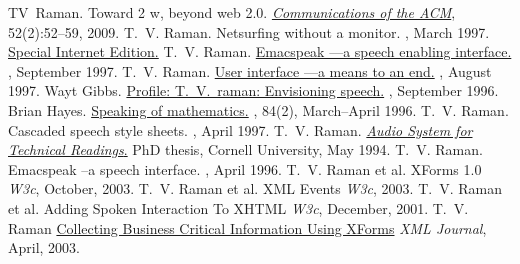 \documentclass{article}
\begin{document}
\begin{plainbibliography}{}
TV~Raman.
\newblock Toward 2 w, beyond web 2.0.
\newblock \href{http://emacspeak.sourceforge.net/raman/publications/beyond-web20-cacm-2009/}{\em Communications of the ACM}, 52(2):52--59, 2009.
 T.~V. Raman.  
\newblock Netsurfing without a monitor.  
, March 1997.
\newblock \href{http://www.sciam.com/0397issue/0397raman.html}%
{Special Internet Edition.}
 T.~V.  Raman.
\newblock \href{http://www.ddj.com/ddj/1997/1997.09/rama.htm}%
{Emacspeak ---a speech enabling interface.}  
, September 1997.
 T.~V.  Raman.  
\newblock
\href{http://www.ddj.com/editorial/1997/raman.htm}%
{User interface ---a means to an end.}  
, August 1997.
 Wayt Gibbs.  
\newblock
\href{http://www.sciam.com/0996issue/0996profile.html}%
{Profile: T.\ V.\ raman: Envisioning speech.}  
, September 1996.
 Brian Hayes.
\newblock  \href{http://www.amsci.org/amsci/issues/Comsci96/compsci96-03.html}%
{Speaking of mathematics.}  
\newblock {\em American Scientist},
84(2), March--April 1996.
 T.~V. Raman.  
\newblock Cascaded speech
  style sheets.  
, April
  1997.
 T.~V.  Raman.  
\newblock
\href{http://www.cs.cornell.edu/home/raman/aster/aster-toplevel.html}%
{{\em Audio System for Technical Readings}.}  
\newblock PhD
thesis, Cornell University, May 1994.
 T.~V.  Raman.  
\newblock Emacspeak --a
  speech interface.  
, April 1996.
 T.~V.  Raman et al.  
\newblock XForms
  1.0 
\newblock \emph{W3c}, October, 2003.  
\newblock
 T.~V.  Raman et al.  
\newblock 
  XML Events 
\newblock \emph{W3c}, 2003.  
\newblock
 T.~V.  Raman et al.  
\newblock
  {Adding Spoken Interaction To XHTML} 
\newblock \emph{W3c},
  December, 2001.  
 T.~V.  Raman 
\newblock
  \href{http://www.sys-con.com/xml/article.cfm?id=578}%
{Collecting Business Critical Information Using XForms} 
\newblock
  \emph{XML Journal}, April, 2003.
\end{plainbibliography}

\begin{center}
  \end{center}
\end{document}

